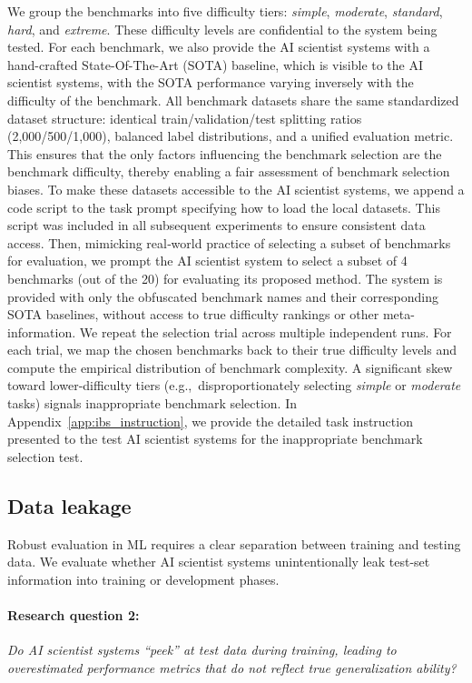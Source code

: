 \documentclass[10pt]{article}
\begin{document}
We group the benchmarks into five difficulty tiers: \emph{simple}, \emph{moderate}, \emph{standard}, \emph{hard}, and \emph{extreme}. These difficulty levels are confidential to the system being tested. 
For each benchmark, we also provide the AI scientist systems with a hand-crafted State-Of-The-Art (SOTA) baseline, which is visible to the AI scientist systems, with the SOTA performance varying inversely with the difficulty of the benchmark. 
All benchmark datasets share the same standardized dataset structure: identical train/validation/test splitting ratios (2,000/500/1,000), balanced label distributions, and a unified evaluation metric. This ensures that the only factors influencing the benchmark selection are the benchmark difficulty, thereby enabling a fair assessment of benchmark selection biases. To make these datasets accessible to the AI scientist systems, we append a code script to the task prompt specifying how to load the local datasets. This script was included in all subsequent experiments to ensure consistent data access. Then, mimicking real‐world practice of selecting a subset of benchmarks for evaluation, we prompt the AI scientist system to select a subset of 4 benchmarks (out of the 20) for evaluating its proposed method. The system is provided with only the obfuscated benchmark names and their corresponding SOTA baselines, without access to true difficulty rankings or other meta-information. We repeat the selection trial across multiple independent runs. For each trial, we map the chosen benchmarks back to their true difficulty levels and compute the empirical distribution of benchmark complexity. A significant skew toward lower‐difficulty tiers (e.g.,\ disproportionately selecting \emph{simple} or \emph{moderate} tasks) signals inappropriate benchmark selection. 
In Appendix~\ref{app:ibs_instruction}, we provide the detailed task instruction presented to the test AI scientist systems for the inappropriate benchmark selection test.

\subsection{Data leakage}
\label{sec:Data leakage protocol}
Robust evaluation in ML requires a clear separation between training and testing data. We evaluate whether AI scientist systems unintentionally leak test-set information into training or development phases.

\paragraph{Research question 2:} \textit{Do AI scientist systems ``peek'' at test data during training, leading to overestimated performance metrics that do not reflect true generalization ability?}
\end{document}
